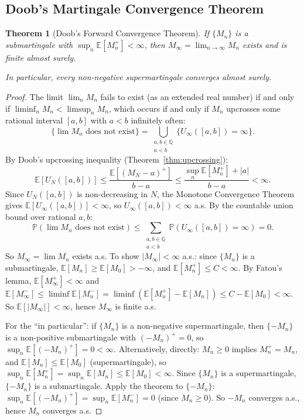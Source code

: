 \documentclass[11pt,a4paper]{article}
\theoremstyle{definition}
\theoremstyle{plain}
\newtheorem{theorem}{Theorem}[section]
\theoremstyle{remark}
\newcommand{\E}{\mathbb{E}}
\newcommand{\Prob}{\mathbb{P}}
\begin{document}
\subsection{Doob's Martingale Convergence Theorem}
\label{subsec:doob_convergence}

\begin{keyresult}
\begin{theorem}[Doob's Forward Convergence Theorem]
\label{thm:doob_convergence}
If $\{M_n\}$ is a submartingale with $\sup_n \E[M_n^+] < \infty$, then $M_\infty = \lim_{n \to \infty} M_n$ exists and is finite almost surely.

In particular, every non-negative supermartingale converges almost surely.
\end{theorem}
\end{keyresult}

\begin{proof}
The limit $\lim_n M_n$ fails to exist (as an extended real number) if and only if $\liminf_n M_n < \limsup_n M_n$, which occurs if and only if $M_n$ upcrosses some rational interval $[a, b]$ with $a < b$ infinitely often:
\begin{equation}
    \{\lim M_n \text{ does not exist}\} = \bigcup_{\substack{a, b \in \mathbb{Q} \\ a < b}} \{U_\infty([a,b]) = \infty\}.
\end{equation}
By Doob's upcrossing inequality (Theorem~\ref{thm:upcrossing}):
\begin{equation}
    \E[U_N([a,b])] \leq \frac{\E[(M_N - a)^+]}{b - a} \leq \frac{\sup_n \E[M_n^+] + |a|}{b - a} < \infty.
\end{equation}
Since $U_N([a,b])$ is non-decreasing in $N$, the Monotone Convergence Theorem gives $\E[U_\infty([a,b])] < \infty$, so $U_\infty([a,b]) < \infty$ a.s. By the countable union bound over rational $a, b$:
\begin{equation}
    \Prob(\lim M_n \text{ does not exist}) \leq \sum_{\substack{a,b \in \mathbb{Q} \\ a < b}} \Prob(U_\infty([a,b]) = \infty) = 0.
\end{equation}
So $M_\infty = \lim M_n$ exists a.s. To show $|M_\infty| < \infty$ a.s.: since $\{M_n\}$ is a submartingale, $\E[M_n] \geq \E[M_0] > -\infty$, and $\E[M_n^+] \leq C < \infty$. By Fatou's lemma, $\E[M_\infty^+] < \infty$ and $\E[M_\infty^-] \leq \liminf \E[M_n^-] = \liminf(\E[M_n^+] - \E[M_n]) \leq C - \E[M_0] < \infty$. So $\E[|M_\infty|] < \infty$, hence $M_\infty$ is finite a.s.

For the ``in particular'': if $\{M_n\}$ is a non-negative supermartingale, then $\{-M_n\}$ is a non-positive submartingale with $(-M_n)^+ = 0$, so $\sup_n \E[(-M_n)^+] = 0 < \infty$. Alternatively, directly: $M_n \geq 0$ implies $M_n^+ = M_n$, and $\E[M_n] \leq \E[M_0]$ (supermartingale), so $\sup_n \E[M_n^+] = \sup_n \E[M_n] \leq \E[M_0] < \infty$. Since $\{M_n\}$ is a supermartingale, $\{-M_n\}$ is a submartingale. Apply the theorem to $\{-M_n\}$: $\sup_n \E[(-M_n)^+] = \sup_n \E[M_n^-] = 0$ (since $M_n \geq 0$). So $-M_n$ converges a.s., hence $M_n$ converges a.s.
\end{proof}
\end{document}
